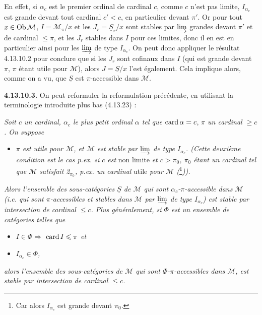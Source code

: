 En effet, si $\alpha_c$ est le premier ordinal de cardinal $c$, comme $c$ n'est pas limite, $I_{\alpha_c}$ est grande devant tout cardinal $c'<c$, en particulier devant $\pi'$. Or pour tout $x\in\operatorname{Ob}\mathcal{M}$, $I=\mathcal{M}_\pi/x$ et les $J_r=\underline{S}_r/x$ sont stables par $\varinjlim$ grandes devant $\pi'$ et de cardinal $\leqslant\pi$,
et les $J_r$ stables dans $I$ pour ces limites, donc il en est en particulier ainsi pour les $\varinjlim$ de type $I_{\alpha_c}$. On peut donc appliquer le résultat 4.13.10.2 pour conclure que si les $J_r$ sont cofinaux dans $I$ (qui est grande devant $\pi$, $\pi$ étant utile pour $\mathcal{M}$), alors $J=\underline{S}/x$ l'est également. Cela implique alors, comme on a vu, que $\underline{S}$ est $\pi$-accessible dans $\mathcal{M}$.

\textbf{4.13.10.3.} On peut reformuler la reformulation précédente, en utilisant la terminologie introduite plus bas (4.13.23) :

\textit{Soit $c$ un cardinal, $\alpha_c$ le plus petit ordinal $\alpha$ tel que} $\operatorname{card}\alpha=c$, \textit{$\pi$ un cardinal $\geqslant c$. On suppose}
\begin{itemize}
\item[$(*)$] \textit{$\pi$ est utile pour $\mathcal{M}$, et $\mathcal{M}$ est stable par $\varinjlim$ de type $I_{\alpha_c}$. (Cette deuxième condition est le cas p.ex. si $c$ est} non limite \textit{et $c>\pi_0$, $\pi_0$ étant un cardinal tel que $\mathcal{M}$ satisfait \textit{2}$_{\pi_0}$, p.ex. un cardinal} utile \textit{pour $\mathcal{M}$ (}\footnote[131]{Car alors $I_{\alpha_c}$ est grande devant $\pi_0$.}\textit{)).}
\end{itemize}
\textit{Alors l'ensemble des sous-catégories $\underline{S}$ de $\mathcal{M}$ qui sont $\alpha_c$-$\pi$-accessible dans $\mathcal{M}$ (i.e. qui sont $\pi$-accessibles et stables dans $\mathcal{M}$ par $\varinjlim$ de type $I_{\alpha_c}$) est stable par intersection de cardinal $\leqslant c$. Plus généralement, si $\Phi$ est un ensemble de catégories telles que} %
\begin{itemize}
\item[\textit{1°)}] \textit{$I\in\Phi\Longrightarrow$} $\operatorname{card} I\leqslant\pi$ \textit{et}
\item[\textit{2°)}] \textit{$I_{\alpha_c}\in\Phi$,}
\end{itemize}
\textit{alors l'ensemble des sous-catégories de $\mathcal{M}$ qui sont $\Phi$-$\pi$-accessibles dans $\mathcal{M}$, est stable par intersection de cardinal $\leqslant c$.}

